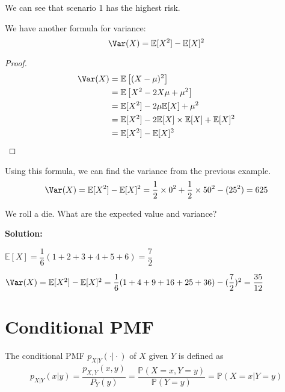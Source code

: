 We can see that scenario 1 has the highest risk. 

We have another formula for variance: 
\[
    \Var(X) = \mathbb{E}[X^2] - \mathbb{E}[X]^2
\]
\begin{proof}
    \[
        \begin{aligned}
            \Var(X) &= \mathbb{E}\left[(X - \mu)^2 \right] \\
            &= \mathbb{E}\left[X^2 -2 X \mu + \mu^2 \right] \\
            &= \mathbb{E}[X^2] -2\mu\mathbb{E}[X] + \mu^2 \\
            &= \mathbb{E}[X^2] - 2\mathbb{E}[X] \times \mathbb{E}[X] + \mathbb{E}[X]^2 \\
            &= \mathbb{E}[X^2] - \mathbb{E}[X]^2
        \end{aligned}
    \]
\end{proof}

Using this formula, we can find the variance from the previous example.
\[
\Var(X) = \mathbb{E}[X^2] - \mathbb{E}[X]^2 = \dfrac{1}{2} \times 0^2 + \dfrac{1}{2} \times 50^2 - (25^2) = 625
\] 

\begin{eg}
    We roll a die. What are the expected value and variance?

    \textbf{Solution:} 
    
    \(\mathbb{E}[X] = \dfrac{1}{6}(1 + 2 + 3 + 4 + 5 + 6) = \dfrac{7}{2}\)

    \(\Var(X) = \mathbb{E}[X^2] - \mathbb{E}[X]^2 = \dfrac{1}{6}(1 + 4 + 9 + 16 + 25 + 36) - (\dfrac{7}{2})^2 = \dfrac{35}{12}\)
\end{eg}

\newpage
\section{Conditional PMF}

\begin{definition}
The conditional PMF \(p_{X \vert Y} (\cdot\vert\cdot)\) of \(X\) given \(Y\) is defined as 
\[
    p_{X \vert Y} (x \vert y) = \dfrac{p_{X,Y}(x, y)}{P_Y (y)} = \dfrac{\mathbb{P}(X = x, Y = y)}{\mathbb{P}(Y = y)} = \mathbb{P}(X = x \vert Y = y)
\]
\end{definition}

